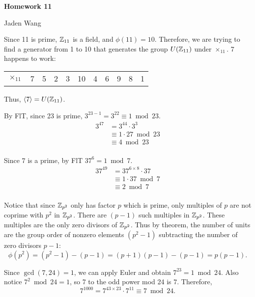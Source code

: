 \documentclass[12pt]{article}
\begin{document}
\centerline {\textsf{\textbf{\LARGE{Homework 11}}}}
\centerline {Jaden Wang}
\vspace{.15in}

\begin{problem}[20.2]
	Since 11 is prime, $ \mathbb{Z}_{11}$ is a field, and $ \phi(11)=10$. Therefore, we are trying to find a generator from 1 to 10 that generates the group $ U(\mathbb{Z}_{11})$ under $ \times _{11}$. 7 happens to work:
	\begin{table}[H]
		\centering
		\begin{tabular}{c|c|c|c|c|c|c|c|c|c|c}
			$ \times_{11} $ &7&5&2&3&10&4&6&9&8&1
		\end{tabular}
	\end{table}
	Thus, $ \langle 7 \rangle = U(\mathbb{Z}_{11})$. 
\end{problem}

\begin{problem}[20.4]
	By FlT, since 23 is prime,  $ 3^{23-1}=3^{22} \equiv 1 \bmod 23$.
\begin{align*}
	3^{47} &= 3^{44} \cdot 3^{3} \\
	&\equiv 1 \cdot 27 \bmod 23 \\
	&\equiv 4 \bmod 23 \\
\end{align*}
\end{problem}

\begin{problem}[20.5]
Since $ 7$ is a prime, by FlT  $ 37^{6}=1 \bmod 7 $.
\begin{align*}
	37^{49}&= 37^{6\times 8} \cdot 37 \\
	&\equiv 1 \cdot 37 \bmod 7 \\
	&\equiv 2 \bmod 7 \\
\end{align*}
\end{problem}

\begin{problem}[20.8]
	Notice that since $ \mathbb{Z}_{p^2}$ only has factor $ p$ which is prime, only multiples of $ p$ are not coprime with  $ p^2$ in $ \mathbb{Z}_{p^2}$. There are $ (p-1)$ such multiples in  $ \mathbb{Z}_{p^2}$. These multiples are the only zero divisors of $ \mathbb{Z}_{p^2}$. Thus by theorem, the number of units are the group order of nonzero elements $ (p^2-1)$ subtracting the number of zero divisors $ p-1$:
	\[
		\phi(p^2)=(p^2-1)-(p-1) = (p+1)(p-1)-(p-1) = p(p-1)
	.\] 
\end{problem}

\begin{problem}[20.10]
Since $ \gcd ( 7,24) =1$, we can apply Euler and obtain $ 7^{23}=1 \bmod 24$. Also notice $ 7^{2} \bmod 24 = 1$, so 7 to the odd power mod 24 is $ 7$. Therefore,
\[
7^{1000}=7^{43\times 23} \cdot 7^{11} \equiv 7 \bmod 24
.\] 
\end{problem}
\end{document}
